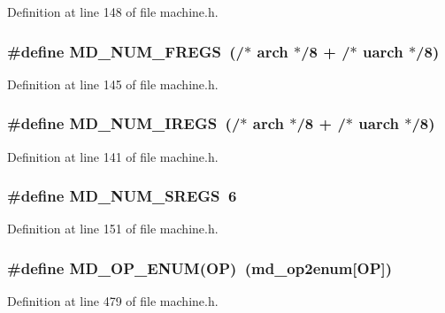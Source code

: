 Definition at line 148 of file machine.h.
\subsubsection[{MD\_\-NUM\_\-FREGS}]{\setlength{\rightskip}{0pt plus 5cm}\#define MD\_\-NUM\_\-FREGS~(/$\ast$ arch $\ast$/8 + /$\ast$ uarch $\ast$/8)}\label{machine_8h_78ff93a9f3fc7554b7fc5f80389f2cc9}




Definition at line 145 of file machine.h.
\subsubsection[{MD\_\-NUM\_\-IREGS}]{\setlength{\rightskip}{0pt plus 5cm}\#define MD\_\-NUM\_\-IREGS~(/$\ast$ arch $\ast$/8 + /$\ast$ uarch $\ast$/8)}\label{machine_8h_b99f4cb95bb7b81734111ae68dd06a38}




Definition at line 141 of file machine.h.
\subsubsection[{MD\_\-NUM\_\-SREGS}]{\setlength{\rightskip}{0pt plus 5cm}\#define MD\_\-NUM\_\-SREGS~6}\label{machine_8h_e4108e4256c25f82b9db0a0ae6fd2ae4}




Definition at line 151 of file machine.h.
\subsubsection[{MD\_\-OP\_\-ENUM}]{\setlength{\rightskip}{0pt plus 5cm}\#define MD\_\-OP\_\-ENUM(OP)~({\bf md\_\-op2enum}[OP])}\label{machine_8h_6725fe5a3dc4ed9774a20cba457443e2}




Definition at line 479 of file machine.h.
